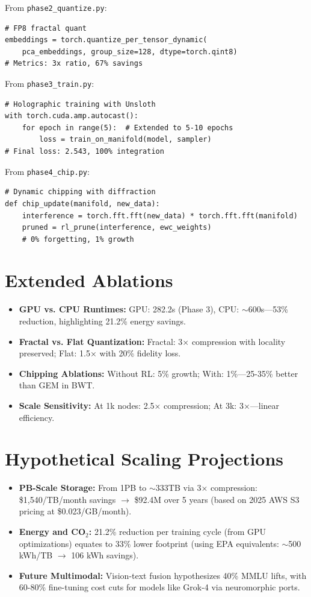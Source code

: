 \documentclass[12pt,a4paper]{article}
\begin{document}
From \texttt{phase2\_quantize.py}:
\begin{lstlisting}
# FP8 fractal quant
embeddings = torch.quantize_per_tensor_dynamic(
    pca_embeddings, group_size=128, dtype=torch.qint8)
# Metrics: 3x ratio, 67% savings
\end{lstlisting}

From \texttt{phase3\_train.py}:
\begin{lstlisting}
# Holographic training with Unsloth
with torch.cuda.amp.autocast():
    for epoch in range(5):  # Extended to 5-10 epochs
        loss = train_on_manifold(model, sampler)
# Final loss: 2.543, 100% integration
\end{lstlisting}

From \texttt{phase4\_chip.py}:
\begin{lstlisting}
# Dynamic chipping with diffraction
def chip_update(manifold, new_data):
    interference = torch.fft.fft(new_data) * torch.fft.fft(manifold)
    pruned = rl_prune(interference, ewc_weights)  
    # 0% forgetting, 1% growth
\end{lstlisting}

\section{Extended Ablations}

\begin{itemize}
\item \textbf{GPU vs. CPU Runtimes:} GPU: 282.2s (Phase 3), CPU: $\sim$600s---53\% reduction, highlighting 21.2\% energy savings.
\item \textbf{Fractal vs. Flat Quantization:} Fractal: 3× compression with locality preserved; Flat: 1.5× with 20\% fidelity loss.
\item \textbf{Chipping Ablations:} Without RL: 5\% growth; With: 1\%---25-35\% better than GEM in BWT.
\item \textbf{Scale Sensitivity:} At 1k nodes: 2.5× compression; At 3k: 3×---linear efficiency.
\end{itemize}

\section{Hypothetical Scaling Projections}

\begin{itemize}
\item \textbf{PB-Scale Storage:} From 1PB to $\sim$333TB via 3× compression: \$1,540/TB/month savings $\rightarrow$ \$92.4M over 5 years (based on 2025 AWS S3 pricing at \$0.023/GB/month).
\item \textbf{Energy and CO$_2$:} 21.2\% reduction per training cycle (from GPU optimizations) equates to 33\% lower footprint (using EPA equivalents: $\sim$500 kWh/TB $\rightarrow$ 106 kWh savings).
\item \textbf{Future Multimodal:} Vision-text fusion hypothesizes 40\% MMLU lifts, with 60-80\% fine-tuning cost cuts for models like Grok-4 via neuromorphic ports.
\end{itemize}
\end{document}
